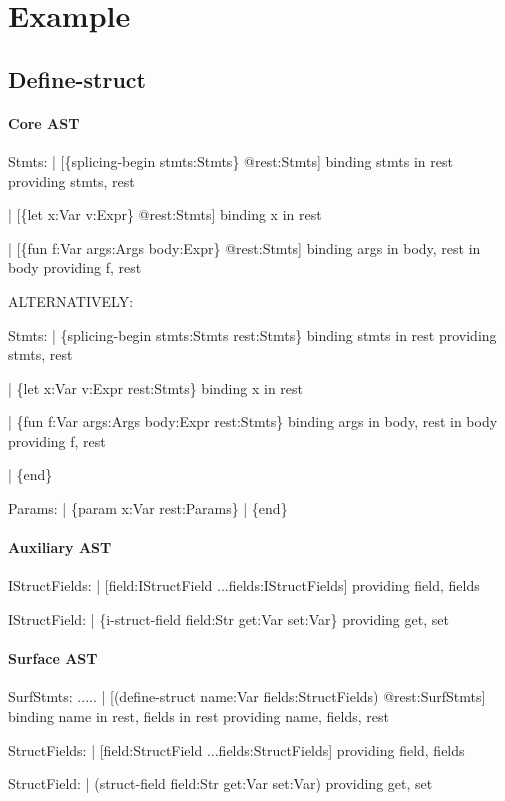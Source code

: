 \newpage
\section{Example}

\subsection{Define-struct}

\paragraph{Core AST}
\begin{Codes}
Stmts:
| [\{splicing-begin stmts:Stmts\} @rest:Stmts]
   binding stmts in rest
   providing stmts, rest

| [\{let x:Var v:Expr\} @rest:Stmts]
   binding x in rest

| [\{fun f:Var args:Args body:Expr\} @rest:Stmts]
   binding args in body, rest in body
   providing f, rest

ALTERNATIVELY:

Stmts:
| \{splicing-begin stmts:Stmts rest:Stmts\}
   binding stmts in rest
   providing stmts, rest

| \{let x:Var v:Expr rest:Stmts\}
   binding x in rest

| \{fun f:Var args:Args body:Expr rest:Stmts\}
   binding args in body, rest in body
   providing f, rest

| \{end\}

Params:
| \{param x:Var rest:Params\}
| \{end\}
\end{Codes}

\paragraph{Auxiliary AST}
\begin{Codes}
IStructFields:
| [field:IStructField ...fields:IStructFields]
  providing field, fields

IStructField:
| \{i-struct-field field:Str get:Var set:Var\}
  providing get, set
\end{Codes}

\paragraph{Surface AST}
\begin{Codes}
SurfStmts:
  .....
| [(define-struct name:Var fields:StructFields) @rest:SurfStmts]
  binding name in rest, fields in rest
  providing name, fields, rest

StructFields:
| [field:StructField ...fields:StructFields]
  providing field, fields

StructField:
| (struct-field field:Str get:Var set:Var)
  providing get, set
\end{Codes}


